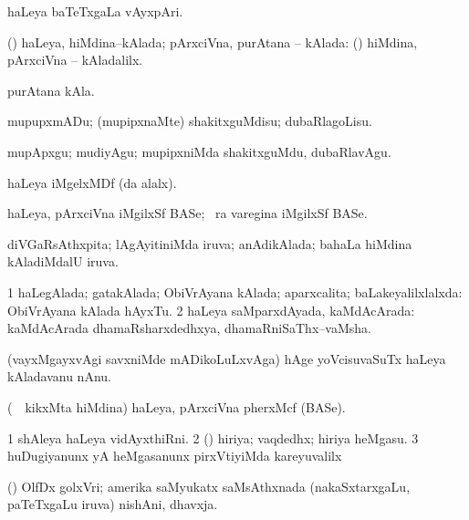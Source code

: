\bentry
{}
\gl{\nA}
\bmng
haLeya baTeTxgaLa vAyxpAri. 
\emng
\eentry

\bentry
{}
\gl{\gu}
\bmng
(\pArxparx) haLeya, hiMdina--kAlada; pArxciVna, purAtana -- kAlada: (\kanmu)  hiMdina, pArxciVna -- kAladalilx. 
\emng

\noindent
\gl{\pagu}
\bmng
{} purAtana kAla. 
\emng
\eentry

\bentry
{}
\gl{\sakirx}
\bmng
mupupxmADu; (mupipxnaMte) shakitxguMdisu; dubaRlagoLisu. 
\emng

\noindent
\gl{\akirx}
\bmng
mupApxgu; mudiyAgu; mupipxniMda shakitxguMdu, dubaRlavAgu. 
\emng
\eentry

\bentry
{}
\gl{\nA}
\bmng
haLeya iMgelxMDf (\ame da  alalx). 
\emng
\eentry

\bentry
{}
\gl{\nA}
\bmng
haLeya, pArxciVna iMgilxSf BASe; \kirxsha\ ra varegina iMgilxSf BASe. 
\emng
\eentry

\bentry
{}
\gl{\gu}
\bmng
diVGaRsAthxpita; lAgAyitiniMda iruva; anAdikAlada; bahaLa hiMdina kAladiMdalU iruva. 
\emng
\eentry

\bentry
{}
\gl{\gu}
\bmng
\bnum
\num{1} haLegAlada; gatakAlada; ObiVrAyana kAlada; aparxcalita; baLakeyalilxlalxda:  ObiVrAyana kAlada hAyxTu. 
\num{2} haLeya saMparxdAyada, kaMdAcArada:  kaMdAcArada dhamaRsharxdedhxya, dhamaRniSaThx--vaMsha. 
\enum
\emng

\noindent
\gl{\pagu}
\bmng
{} (vayxMgayxvAgi savxniMde mADikoLuLxvAga) hAge yoVcisuvaSuTx haLeya kAladavanu nAnu. 
\emng
\eentry

\bentry
{}
\gl{\nA}
\bmng
(\kanmu\ \kirxsha\ kikxMta hiMdina) haLeya, pArxciVna pherxMcf (BASe). 
\emng
\eentry

\bentry
{}
\gl{\nA}
\bmng
\bnum
\num{1} shAleya haLeya vidAyxthiRni. 
\num{2} (\AmA) hiriya; vaqdedhx; hiriya heMgasu. 
\num{3} huDugiyanunx yA heMgasanunx pirxVtiyiMda kareyuvalilx \parx 
\enum
\emng
\eentry

\bentry
{}
\gl{\nA}
\bmng
(\ame) OlfDx golxVri; amerika saMyukatx saMsAthxnada (nakaSxtarxgaLu, paTeTxgaLu iruva) nishAni, dhavxja. 
\emng
\eentry

